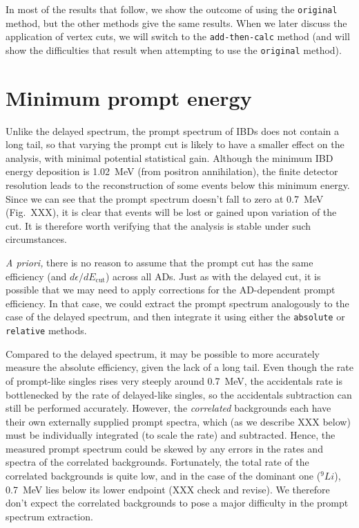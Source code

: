 \documentclass[../thesis.tex]{subfiles}
\begin{document}
In most of the results that follow, we show the outcome of using the \texttt{original} method, but the other methods give the same results. When we later discuss the application of vertex cuts, we will switch to the \texttt{add-then-calc} method (and will show the difficulties that result when attempting to use the \texttt{original} method).

\section{Minimum prompt energy}
\label{sec:cutVaryMinPrompt}

Unlike the delayed spectrum, the prompt spectrum of IBDs does not contain a long tail, so that varying the prompt cut is likely to have a smaller effect on the analysis, with minimal potential statistical gain. Although the minimum IBD energy deposition is 1.02~MeV (from positron annihilation), the finite detector resolution leads to the reconstruction of some events below this minimum energy. Since we can see that the prompt spectrum doesn't fall to zero at 0.7~MeV (Fig.~XXX), it is clear that events will be lost or gained upon variation of the cut. It is therefore worth verifying that the analysis is stable under such circumstances.

\emph{A priori,} there is no reason to assume that the prompt cut has the same efficiency (and $d\epsilon/dE_{\mathrm{cut}}$) across all ADs. Just as with the delayed cut, it is possible that we may need to apply corrections for the AD-dependent prompt efficiency. In that case, we could extract the prompt spectrum analogously to the case of the delayed spectrum, and then integrate it using either the \texttt{absolute} or \texttt{relative} methods.

Compared to the delayed spectrum, it may be possible to more accurately measure the absolute efficiency, given the lack of a long tail. Even though the rate of prompt-like singles rises very steeply around 0.7~MeV, the accidentals rate is bottlenecked by the rate of delayed-like singles, so the accidentals subtraction can still be performed accurately. However, the \emph{correlated} backgrounds each have their own externally supplied prompt spectra, which (as we describe XXX below) must be individually integrated (to scale the rate) and subtracted. Hence, the measured prompt spectrum could be skewed by any errors in the rates and spectra of the correlated backgrounds. Fortunately, the total rate of the correlated backgrounds is quite low, and in the case of the dominant one ($^9Li$), 0.7~MeV lies below its lower endpoint (XXX check and revise). We therefore don't expect the correlated backgrounds to pose a major difficulty in the prompt spectrum extraction.
\end{document}
